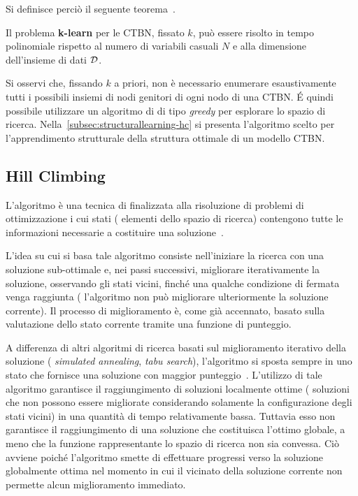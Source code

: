 Si definisce perciò il seguente teorema~\citep{Nodelman2002}.
\begin{teorema}
Il problema \textbf{k-learn} per le \acl{CTBN}, fissato $k$, può essere risolto in tempo polinomiale rispetto al numero di variabili casuali $N$ e alla dimensione dell'insieme di dati $\mathcal{D}$.
\end{teorema}

Si osservi che, fissando $k$ a priori, non è necessario enumerare esaustivamente tutti i possibili insiemi di nodi genitori di ogni nodo di una \acs{CTBN}. \'E quindi possibile utilizzare un algoritmo di  di tipo \emph{greedy} per esplorare lo spazio di ricerca. Nella~\autoref{subsec:structurallearning-hc} si presenta l'algoritmo scelto per l'apprendimento strutturale della struttura ottimale di un modello \acs{CTBN}.

\subsection{Hill Climbing}\label{subsec:structurallearning-hc}
L'algoritmo \emph{\keyword{\hc{}}} è una tecnica di  finalizzata alla risoluzione di problemi di ottimizzazione i cui stati (\ie{} elementi dello spazio di ricerca) contengono tutte le informazioni necessarie a costituire una soluzione~\citep{Russel2003}.

L'idea su cui si basa tale algoritmo consiste nell'iniziare la ricerca con una soluzione sub-ottimale e, nei passi successivi, migliorare iterativamente la soluzione, osservando gli stati vicini, finché una qualche condizione di fermata venga raggiunta (\eg{} l'algoritmo non può migliorare ulteriormente la soluzione corrente). Il processo di miglioramento è, come già accennato, basato sulla valutazione dello stato corrente tramite una funzione di punteggio.

A differenza di altri algoritmi di ricerca basati sul miglioramento iterativo della soluzione (\eg{} \emph{simulated annealing}, \emph{tabu search}), l'algoritmo \emph{\keyword{\hc{}}} si sposta sempre in uno stato che fornisce una soluzione con maggior punteggio~\citep{Russel2003}. L'utilizzo di tale algoritmo garantisce il raggiungimento di soluzioni localmente ottime (\ie{} soluzioni che non possono essere migliorate considerando solamente la configurazione degli stati vicini) in una quantità di tempo relativamente bassa. Tuttavia esso non garantisce il raggiungimento di una soluzione che costituisca l'ottimo globale, a meno che la funzione rappresentante lo spazio di ricerca non sia convessa. Ciò avviene poiché l'algoritmo smette di effettuare progressi verso la soluzione globalmente ottima nel momento in cui il vicinato della soluzione corrente non permette alcun miglioramento immediato.

